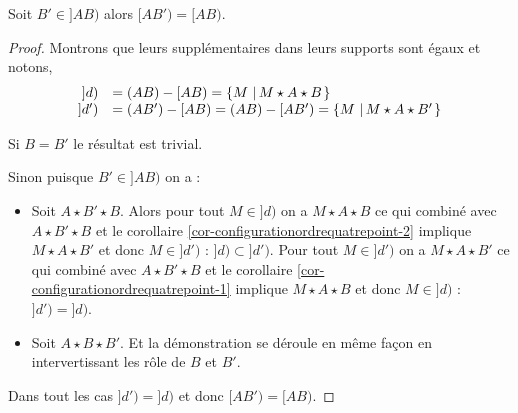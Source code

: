 \begin{cor}
    Soit $B'\in]AB)$ alors $[AB') = [AB)$.
    \begin{proof}
        Montrons que leurs supplémentaires dans leurs supports sont égaux et notons,
        \begin{equation*}
            \begin{array}{rl}
                 ]d) & = (AB)-[AB) = \left\{M\,\left|\,M\star A \star B\right.\right\}  \\
                 ]d') & = (AB')-[AB) = (AB)-[AB') = \left\{M\,\left|\,M\star A \star B'\right.\right\}
            \end{array}
        \end{equation*}

        Si $B=B'$ le résultat est trivial. 
        
        Sinon puisque $B'\in]AB)$ on a : 
        \begin{itemize}[$\bullet$]
            \item Soit $A\star B' \star B$. Alors pour tout $M\in ]d)$ on a $M\star A\star B$ ce qui combiné avec $A\star B' \star B$ et le corollaire \ref{cor-configurationordrequatrepoint-2} implique $M\star A \star B'$ et donc $M\in ]d')$ : $]d)\subset ]d')$. Pour tout $M\in ]d')$ on a $M\star A\star B'$ ce qui combiné avec $A\star B' \star B$ et le corollaire \ref{cor-configurationordrequatrepoint-1} implique $M\star A \star B$ et donc $M\in ]d)$ : $]d') =  ]d)$.
            \item Soit $A\star B \star B'$. Et la démonstration se déroule en même façon en intervertissant les rôle de $B$ et $B'$.
        \end{itemize}
        Dans tout les cas $]d') =  ]d)$ et donc $[AB') = [AB)$.
    \end{proof}
\end{cor}
